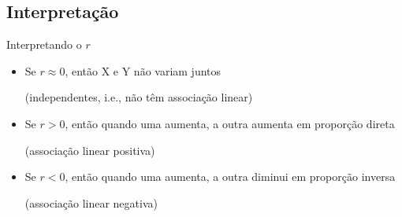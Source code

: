 \documentclass{beamer}
\begin{document}

    

    


\subsection{Interpretação}

\begin{frame}{\scriptsize Interpretando o $r$}
  \begin{itemize}
    \footnotesize
  \item Se $r \approx 0$, então X e Y não variam juntos

    {\tiny (independentes, i.e., não têm associação linear)}
    \bigskip
  \item Se $r>0$, então quando uma aumenta, a outra
    aumenta em proporção direta

    {\tiny (associação linear positiva)}
    \bigskip
  \item Se $r<0$, então quando uma aumenta, a outra
    diminui em proporção inversa

    {\tiny (associação linear negativa)}
  \end{itemize}
\end{frame}
\end{document}
